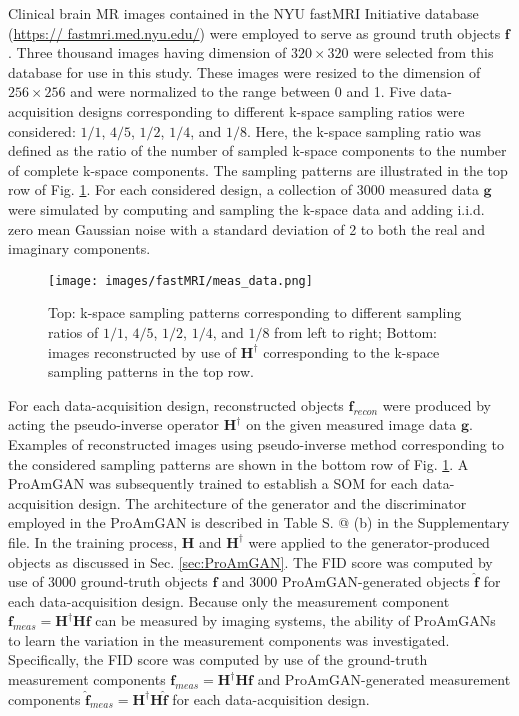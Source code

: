 \documentclass[journal]{IEEEtran}
\makeatletter
\renewcommand{\vec}[1]{\mathbf{#1}}
\newcommand*{\rom}[1]{\expandafter\@slowromancap\romannumeral #1@}
\makeatother
\begin{document}
Clinical brain MR images contained in the NYU fastMRI Initiative database~\cite{zbontar2018fastmri} (\url{https:// fastmri.med.nyu.edu/})  were employed to serve as ground truth objects $\mathbf{f}$.
Three thousand images having dimension of $320\times 320$ were selected from this database for use in this study. 
These images were resized to the dimension of $256\times 256$ and were normalized to the range between 0 and 1.
Five data-acquisition designs corresponding to different k-space sampling ratios were considered: ${1}/{1}$, ${4}/{5}$, ${1}/{2}$, ${1}/{4}$, and ${1}/{8}$.
Here, the k-space sampling ratio was defined as the ratio of the number of sampled k-space components to the number of complete k-space components.
The sampling patterns are illustrated in the top row of Fig. \ref{fig:fastMRI}.
For each considered design, a collection of 3000 measured data $\vec{g}$ were simulated by computing and sampling the k-space data and adding i.i.d. zero mean Gaussian noise with a standard deviation of 2 to both the real and imaginary components.

\begin{figure}[H]
   \centering
 \texttt{[image: images/fastMRI/meas\_data.png]}
 \vspace{-0.5cm}
 \caption{Top: k-space sampling patterns corresponding to different sampling ratios of ${1}/{1}$, ${4}/{5}$, ${1}/{2}$, ${1}/{4}$, and ${1}/{8}$ from left to right; 
Bottom: images reconstructed by use of $\mathbf{H}^{\dagger}$ corresponding to the k-space sampling patterns in the top row.}
 \label{fig:fastMRI}
  \vspace{-0.35cm}
\end{figure}

For each data-acquisition design,
reconstructed objects $\vec{f}_{recon}$ were produced by acting the pseudo-inverse operator $\mathbf{H}^{\dagger}$ on the given measured image data $\vec{g}$.
Examples of reconstructed images using pseudo-inverse method corresponding to the considered sampling patterns are shown in the bottom row of Fig. \ref{fig:fastMRI}.
A ProAmGAN was subsequently trained to establish a SOM for each data-acquisition design.
The architecture of the generator and the discriminator employed in the ProAmGAN is described in Table S. \rom{1} (b) in the Supplementary file. 
 In the training process, $\mathbf{H}$ and $\mathbf{H}^{\dagger}$ were applied to the generator-produced objects as discussed in Sec. \ref{sec:ProAmGAN}.
 The FID score was computed by use of 3000 ground-truth objects $\vec{f}$ and 3000 ProAmGAN-generated objects $\hat{\vec{f}}$
 for each data-acquisition design. 
 Because only the measurement component $\vec{f}_{meas} = \mathbf{H}^{\dagger}\mathbf{H}\vec{f}$ can be measured by imaging systems, 
the ability of ProAmGANs to learn the variation in the measurement components was investigated.
Specifically, 
 the FID score was computed by use of the ground-truth measurement components $\vec{f}_{meas} = \mathbf{H}^{\dagger}\mathbf{H}\vec{f}$
 and ProAmGAN-generated measurement components $\hat{\vec{f}}_{meas}= \mathbf{H}^{\dagger}\mathbf{H}\hat{\vec{f}}$ for each data-acquisition design.
\end{document}
